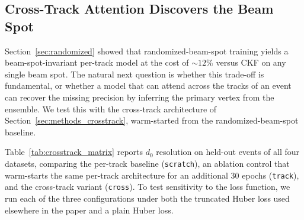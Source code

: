 \documentclass[11pt]{article}
\begin{document}
\subsection{Cross-Track Attention Discovers the Beam Spot}
\label{sec:crosstrack_results}

Section~\ref{sec:randomized} showed that randomized-beam-spot training yields a beam-spot-invariant per-track model at the cost of $\sim 12\%$ versus CKF on any single beam spot.
The natural next question is whether this trade-off is fundamental, or whether a model that can attend across the tracks of an event can recover the missing precision by inferring the primary vertex from the ensemble.
We test this with the cross-track architecture of Section~\ref{sec:methods_crosstrack}, warm-started from the randomized-beam-spot baseline.

Table~\ref{tab:crosstrack_matrix} reports $d_0$ resolution on held-out events of all four datasets, comparing the per-track baseline (\texttt{scratch}), an ablation control that warm-starts the same per-track architecture for an additional 30 epochs (\texttt{track}), and the cross-track variant (\texttt{cross}). To test sensitivity to the loss function, we run each of the three configurations under both the truncated Huber loss used elsewhere in the paper and a plain Huber loss.
\end{document}
